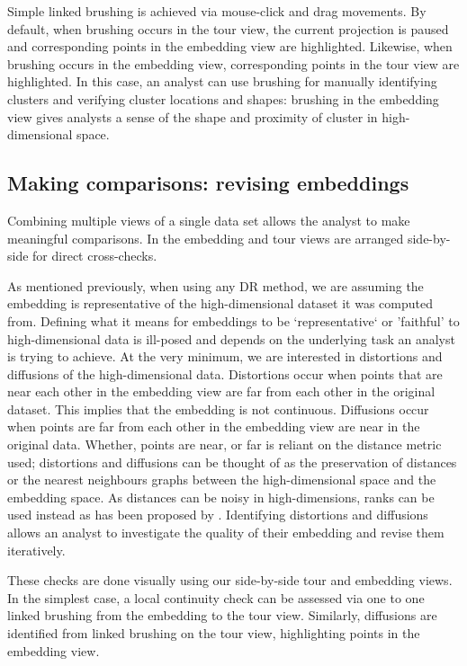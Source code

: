 \documentclass[article,notitle]{jdssv}
\begin{document}
Simple linked brushing is achieved via mouse-click and drag movements. By
default, when brushing occurs in the tour view, the current projection is
paused and corresponding points in the embedding view are highlighted.
Likewise, when brushing occurs in the embedding view, corresponding points in
the tour view are highlighted. In this case, an analyst can use brushing for
manually identifying clusters and verifying cluster locations and shapes:
brushing in the embedding view gives analysts a sense of the shape and
proximity of cluster in high-dimensional space.

\hypertarget{making-comparisons-revising-embeddings}{%
\subsection{Making comparisons: revising embeddings}\label{making-comparisons-revising-embeddings}}

Combining multiple views of a single data set allows the analyst
to make meaningful comparisons. In  the embedding
and tour views are arranged side-by-side for direct cross-checks.

As mentioned previously, when using any DR method, we are assuming the
embedding is representative of the high-dimensional dataset it was computed
from. Defining what it means for embeddings to be `representative` or 'faithful'
to high-dimensional data is ill-posed and depends on the underlying task an
analyst is trying to achieve. At the very minimum, we are interested in
distortions and diffusions of the high-dimensional data. Distortions occur when
points that are near each other in the embedding view are far from each other
in the original dataset. This implies that the embedding is not continuous.
Diffusions occur when points are far from each other in the embedding view are
near in the original data. Whether, points are near, or far is reliant on the
distance metric used; distortions and diffusions can be thought of as the
preservation of distances or the nearest neighbours graphs between the
high-dimensional space and the embedding space. As distances can be noisy in
high-dimensions, ranks can be used instead as has been proposed by \citet{Lee2009-zb}.
Identifying distortions and diffusions allows an analyst to investigate the
quality of their embedding and revise them iteratively.

These checks are done visually using our side-by-side tour and embedding views.
In the simplest case, a local continuity check can be assessed via one to
one linked brushing from the embedding to the tour view. Similarly, diffusions
are identified from linked brushing on the tour view, highlighting points
in the embedding view.
\end{document}
